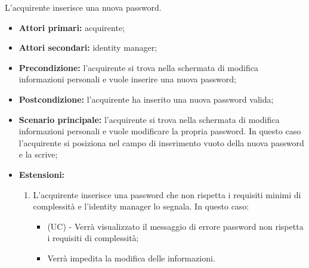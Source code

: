 L'acquirente inserisce una nuova password.
\begin{itemize}
    \item \textbf{Attori primari:} acquirente;
    \item \textbf{Attori secondari:} identity manager;
    \item \textbf{Precondizione:} l'acquirente si trova nella schermata di modifica informazioni personali e vuole inserire una nuova password;
    \item \textbf{Postcondizione:} l'acquirente ha inserito una nuova password valida;
    \item \textbf{Scenario principale:} l'acquirente si trova nella schermata di modifica informazioni personali e vuole modificare la propria password. In questo caso l'acquirente si posiziona nel campo di inserimento vuoto della nuova password e la scrive;
    \item \textbf{Estensioni:}
    \begin{enumerate}[label=\lett]
        \item L'acquirente inserisce una password che non rispetta i requisiti minimi di complessità e l'identity manager lo segnala. In questo caso:
        \begin{itemize}
            \item (UC) - Verrà visualizzato il messaggio di errore password non rispetta i requisiti di complessità;
            \item Verrà impedita la modifica delle informazioni.
        \end{itemize}
    \end{enumerate}
\end{itemize}

